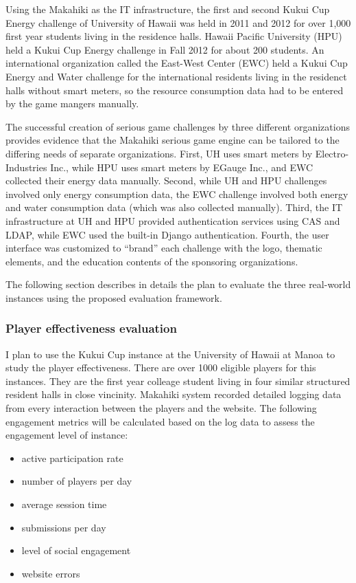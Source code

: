 Using the Makahiki as the IT infrastructure, the first and second Kukui Cup Energy challenge of University of Hawaii was held in 2011 and 2012 for over 1,000 first year students living in the residence halls. Hawaii Pacific University (HPU) held a Kukui Cup Energy challenge in Fall 2012 for about 200 students. An international organization called the East-West Center (EWC) held a Kukui Cup Energy and Water challenge for the international residents living in the residenct halls without smart meters, so the resource consumption data had to be entered by the game mangers manually.

The successful creation of serious game challenges by three different organizations provides evidence that the Makahiki serious game engine can be tailored to the differing needs of separate organizations. First, UH uses smart meters by Electro-Industries Inc., while HPU uses smart meters by EGauge Inc., and EWC collected their energy data manually. Second, while UH and HPU challenges involved only energy consumption data, the EWC challenge involved both energy and water consumption data (which was also collected manually).  Third, the IT infrastructure at UH and HPU provided authentication services using CAS and LDAP, while EWC used the built-in Django authentication. Fourth, the user interface was customized to ``brand'' each challenge with the logo, thematic elements, and the education contents of the sponsoring organizations.

The following section describes in details the plan to evaluate the three real-world instances using the proposed evaluation framework.

\subsubsection{Player effectiveness evaluation}

I plan to use the Kukui Cup instance at the University of Hawaii at Manoa to study the player effectiveness. There are over 1000 eligible players for this instances. They are the first year colleage student living in four similar structured resident halls in close vincinity. Makahiki system recorded detailed logging data from every interaction between the players and the website. The following engagement metrics will be calculated based on the log data to assess the engagement level of instance:

\begin{itemize}
\item active participation rate
\item number of players per day
\item average session time
\item submissions per day
\item level of social engagement
\item website errors
\end{itemize}

